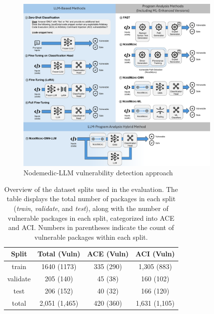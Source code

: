 \documentclass[12pt,openany,oneside,table]{cmuthesis}
\begin{document}
\begin{figure}[t]
    \centering
    \includegraphics[width=0.9\textwidth]{figures/approach/nodemedic.pdf}
    \caption{Nodemedic-LLM vulnerability detection approach}
    \label{fig:nodemedic}
\end{figure}


\begin{table}[t]
\centering
\caption{Overview of the dataset splits used in the evaluation. The table displays the total number of packages in each split (\textit{train}, \textit{validate}, and \textit{test}), along with the number of vulnerable packages in each split, categorized into ACE and ACI. Numbers in parentheses indicate the count of vulnerable packages within each split.
}
\label{tab:dataset-overview}
\begin{tabular}{|c|c|c|c|}
\hline
\textbf{Split} & \textbf{Total (Vuln)} & \textbf{ACE (Vuln)} & \textbf{ACI (Vuln)} \\ \hline
train & 1640 (1173) & 335 (290) & 1,305 (883) \\ \hline
validate & 205 (140) & 45 (38) & 160 (102) \\ \hline
test & 206 (152) & 40 (32) & 166 (120) \\ \hline
total & 2,051 (1,465) & 420 (360) & 1,631 (1,105) \\ \hline
\end{tabular}
\end{table}
\end{document}
